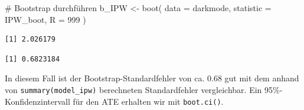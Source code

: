 \documentclass[
  a4paper,
  DIV=11,
  oneside]{scrreprt}
\newenvironment{Shaded}{\begin{snugshade}}{\end{snugshade}}
\newcommand{\AttributeTok}[1]{\textcolor[rgb]{0.40,0.45,0.13}{#1}}
\newcommand{\CommentTok}[1]{\textcolor[rgb]{0.37,0.37,0.37}{#1}}
\newcommand{\DecValTok}[1]{\textcolor[rgb]{0.68,0.00,0.00}{#1}}
\newcommand{\FunctionTok}[1]{\textcolor[rgb]{0.28,0.35,0.67}{#1}}
\newcommand{\NormalTok}[1]{\textcolor[rgb]{0.00,0.23,0.31}{#1}}
\newcommand{\OtherTok}[1]{\textcolor[rgb]{0.00,0.23,0.31}{#1}}
\newcommand{\SpecialCharTok}[1]{\textcolor[rgb]{0.37,0.37,0.37}{#1}}
\begin{document}
\begin{Shaded}
\end{Shaded}

\begin{Shaded}
\begin{Highlighting}[]
\CommentTok{\# Bootstrap durchführen}
\NormalTok{b\_IPW }\OtherTok{\textless{}{-}} \FunctionTok{boot}\NormalTok{(}
  \AttributeTok{data =}\NormalTok{ darkmode,}
  \AttributeTok{statistic =}\NormalTok{ IPW\_boot, }
  \AttributeTok{R =} \DecValTok{999}
\NormalTok{)}
\end{Highlighting}
\end{Shaded}

\begin{Shaded}
\end{Shaded}

\begin{verbatim}
[1] 2.026179
\end{verbatim}

\begin{Shaded}
\end{Shaded}

\begin{verbatim}
[1] 0.6823184
\end{verbatim}

In diesem Fall ist der Bootstrap-Standardfehler von ca. 0.68 gut mit dem
anhand von \texttt{summary(model\_ipw)} berechneten Standardfehler
vergleichbar. Ein 95\%-Konfidenzintervall für den ATE erhalten wir mit
\texttt{boot.ci()}.
\end{document}
